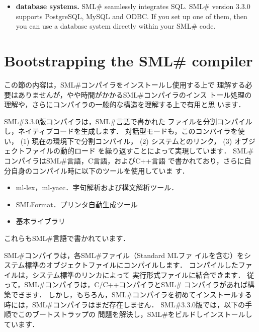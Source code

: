 \documentclass{jbook}
\newcommand{\txt}[2]{#2}
\newcommand{\smlsharp}{SML\#}
\newcommand{\version}{3.3.0}
\begin{document}
\begin{itemize}
	If your purpose is to make a small program entirely within
\smlsharp{}, then you will not need to invoke a C compiler directly.
	However, if you want to make a paractical program, you may want to
call some system library functions or you may write some part of your
system in C and call that function from your ML code.
	This is straightforward in \smlsharp{}.
	To exploit this feature, we recommend that you familiarize
yourself with C compiler.

\item {\bf database systems.}
	\smlsharp{} seamlessly integrates SQL.
	\smlsharp{} version \version{} supports PostgreSQL, MySQL and ODBC.
	If you set up one of them, then you can use a database system
directly within your \smlsharp{} code.
\end{itemize}

\fi%


\section{
\txt{\smlsharp{}コンパイラの構造とブートストラップ}
    {Bootstrapping the \smlsharp{} compiler}
}
\label{sec:tutorialBootstrap}

\ifjp%
	この節の内容は，\smlsharp{}コンパイラをインストールし使用する上で
理解する必要はありませんが，やや時間がかかる\smlsharp{}コンパイラのインス
トール処理の理解や，さらにコンパイラの一般的な構造を理解する上で有用と思
います．

	\smlsharp{}\version{}版コンパイラは，\smlsharp{}言語で書かれた
ファイルを分割コンパイルし，ネイティブコードを生成します．
	対話型モードも，このコンパイラを使い，
(1) 現在の環境下で分割コンパイル，
(2) システムとのリンク，
(3) オブジェクトファイルの動的ロード
を繰り返すことによって実現しています．
	\smlsharp{}コンパイラは\smlsharp{}言語，C言語，およびC++言語
で書かれており，さらに自分自身のコンパイル時に以下のツールを使用していま
す．
\begin{itemize}
\item ml-lex，ml-yacc．字句解析および構文解析ツール．
\item SMLFormat．プリンタ自動生成ツール
\item 基本ライブラリ
\end{itemize}
	これらも\smlsharp{}言語で書かれています．

	\smlsharp{}コンパイラは，各\smlsharp{}ファイル（Standard MLファ
イルを含む）をシステム標準のオブジェクトファイルにコンパイルします．
	コンパイルしたファイルは，システム標準のリンカによって
実行形式ファイルに結合できます．
	従って，\smlsharp{}コンパイラは，C/C++コンパイラと\smlsharp{}
コンパイラがあれば構築できます．
	しかし，もちろん，\smlsharp{}コンパイラを初めてインストールする
時には，\smlsharp{}コンパイラはまだ存在しません．
	\smlsharp{}\version{}版では，以下の手順でこのブートストラップの
問題を解決し，\smlsharp{}をビルドしインストールしています．
\end{document}
